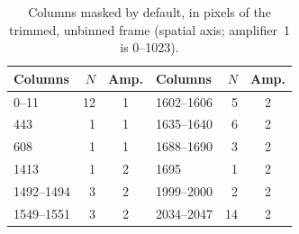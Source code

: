 \begin{table}[t]
  \centering\small
  \caption{Columns masked by default, in pixels of the trimmed, unbinned frame
    (spatial axis; amplifier~1 is 0--1023).}
  \label{tab:bpm}
  \begin{tabular}{lrclrc}
    \toprule
    Columns & $N$ & Amp. & Columns & $N$ & Amp. \\
    \midrule
    0--11 & 12 & 1 & 1602--1606 & 5 & 2 \\
    443 & 1 & 1 & 1635--1640 & 6 & 2 \\
    608 & 1 & 1 & 1688--1690 & 3 & 2 \\
    1413 & 1 & 2 & 1695 & 1 & 2 \\
    1492--1494 & 3 & 2 & 1999--2000 & 2 & 2 \\
    1549--1551 & 3 & 2 & 2034--2047 & 14 & 2 \\
    \bottomrule
  \end{tabular}
\end{table}
